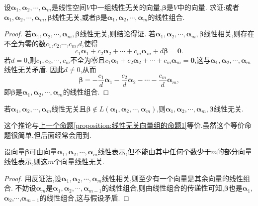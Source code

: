 \documentclass[../../main.tex]{subfiles}%
\begin{document}
\begin{proposition}\label{proposition:线性无关向量组的命题1}
设\(\boldsymbol{\alpha}_1,\boldsymbol{\alpha}_2,\cdots,\boldsymbol{\alpha}_m\)是线性空间\(V\)中一组线性无关的向量,\(\boldsymbol{\beta}\)是\(V\)中的向量. 求证:或者\(\boldsymbol{\alpha}_1,\boldsymbol{\alpha}_2,\cdots,\boldsymbol{\alpha}_m,\boldsymbol{\beta}\)线性无关,或者\(\boldsymbol{\beta}\)是\(\boldsymbol{\alpha}_1,\boldsymbol{\alpha}_2,\cdots,\boldsymbol{\alpha}_m\)的线性组合.
\end{proposition}
\begin{proof}
若\(\boldsymbol{\alpha}_1,\boldsymbol{\alpha}_2,\cdots,\boldsymbol{\alpha}_m,\boldsymbol{\beta}\)线性无关,则结论得证. 若\(\boldsymbol{\alpha}_1,\boldsymbol{\alpha}_2,\cdots,\boldsymbol{\alpha}_m,\boldsymbol{\beta}\)线性相关,则存在不全为零的数$c_1$,$c_2$,$\cdots$,$c_m$,$d$,使得
\[
c_1\boldsymbol{\alpha}_1 + c_2\boldsymbol{\alpha}_2+\cdots + c_m\boldsymbol{\alpha}_m + d\boldsymbol{\beta}=\boldsymbol{0}.
\]
若\(d = 0\),则\(c_1,c_2,\cdots,c_m\)不全为零且\(c_1\boldsymbol{\alpha}_1 + c_2\boldsymbol{\alpha}_2+\cdots + c_m\boldsymbol{\alpha}_m=\boldsymbol{0}\),这与\(\boldsymbol{\alpha}_1,\boldsymbol{\alpha}_2,\cdots,\boldsymbol{\alpha}_m\)线性无关矛盾. 因此\(d\neq0\),从而
\[
\boldsymbol{\beta}=-\frac{c_1}{d}\boldsymbol{\alpha}_1-\frac{c_2}{d}\boldsymbol{\alpha}_2-\cdots-\frac{c_m}{d}\boldsymbol{\alpha}_m,
\]
即\(\boldsymbol{\beta}\)是\(\boldsymbol{\alpha}_1,\boldsymbol{\alpha}_2,\cdots,\boldsymbol{\alpha}_m\)的线性组合.
\end{proof}

\begin{corollary}\label{corollary:线性无关向量组的命题1}
若\(\boldsymbol{\alpha}_1,\boldsymbol{\alpha}_2,\cdots,\boldsymbol{\alpha}_m\)线性无关且\(\boldsymbol{\beta}\notin L(\boldsymbol{\alpha}_1,\boldsymbol{\alpha}_2,\cdots,\boldsymbol{\alpha}_m)\),则\(\boldsymbol{\alpha}_1,\boldsymbol{\alpha}_2,\cdots,\boldsymbol{\alpha}_m,\boldsymbol{\beta}\)线性无关. 
\end{corollary}
\begin{note}
这个推论与\hyperref[proposition:线性无关向量组的命题1]{上一个命题\ref{proposition:线性无关向量组的命题1}}等价.虽然这个等价命题很简单,但后面经常会用到.
\end{note}

\begin{proposition}\label{proposition:线性无关向量组的命题2}
设向量\(\boldsymbol{\beta}\)可由向量\(\boldsymbol{\alpha}_1,\boldsymbol{\alpha}_2,\cdots,\boldsymbol{\alpha}_m\)线性表示,但不能由其中任何个数少于\(m\)的部分向量线性表示,则这\(m\)个向量线性无关.
\end{proposition}
\begin{proof}
用反证法,设\(\boldsymbol{\alpha}_1,\boldsymbol{\alpha}_2,\cdots,\boldsymbol{\alpha}_m\)线性相关,则至少有一个向量是其余向量的线性组合. 不妨设\(\boldsymbol{\alpha}_m\)是\(\boldsymbol{\alpha}_1,\boldsymbol{\alpha}_2,\cdots,\boldsymbol{\alpha}_{m - 1}\)的线性组合,则由线性组合的传递性可知,\(\boldsymbol{\beta}\)也是$\boldsymbol{\alpha}_1$,$\boldsymbol{\alpha}_2$,$\cdots$,$\boldsymbol{\alpha}_{m - 1}$的线性组合,这与假设矛盾. 
\end{proof}
\end{document}
